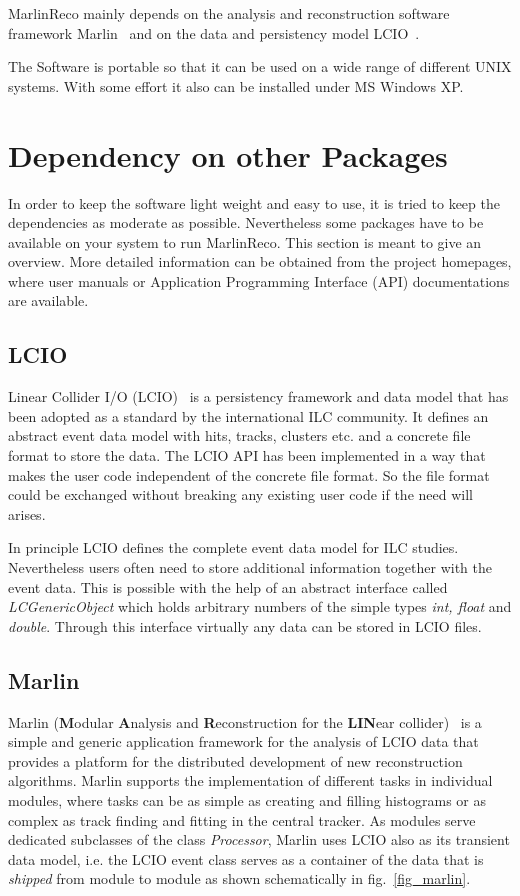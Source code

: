 MarlinReco mainly depends on the analysis and reconstruction
software framework Marlin~\cite{ref_marlin} and on the data and persistency
model LCIO~\cite{ref_lcio,ref_lciohome}.

The Software is portable so that it can be used on a wide range of
different UNIX systems. With some effort it also can be installed under
MS Windows XP.

\section{Dependency on other Packages}

In order to keep the software light weight and easy to use,
it is tried to keep the dependencies as moderate as possible.
Nevertheless some packages have to be available on your system to run
MarlinReco. This section is meant to give an overview. More detailed
information can be obtained from the project homepages, where user manuals or
Application Programming Interface (API) documentations are available.

\subsection{LCIO}

Linear Collider I/O (LCIO)~\cite{ref_lcio,ref_lciohome} is a persistency framework and data model
that has been adopted as a standard by the international ILC community.
It defines an abstract event data model with hits, tracks, clusters etc. and
a concrete file format to store the data. The LCIO API
has been implemented in a way that makes the user code
independent of the concrete file format. So the file format could be exchanged
without breaking any existing user code if the need will arises.

In principle LCIO defines the complete event data model for ILC studies.
Nevertheless users often need to store additional information together with
the event data.
This is possible with the help of an abstract interface called
{\em LCGenericObject} which holds arbitrary numbers of the simple types
{\em int, float} and {\em double}. Through this interface virtually any data
can be stored in LCIO files.

\subsection{Marlin}

Marlin ({\bf M}odular {\bf A}nalysis and {\bf R}econstruction for the
{\bf LIN}ear collider)~\cite{ref_marlin} is a simple and generic
\CPP application framework for the analysis of LCIO data that provides a
platform for the distributed development of new reconstruction
algorithms. Marlin supports the implementation of different tasks in individual
modules, where tasks can be as simple as creating and filling
histograms or as complex as track finding and fitting
in the central tracker. As modules serve dedicated subclasses of
the class {\em Processor},
Marlin uses LCIO also as its transient data model, i.e.
the LCIO event class serves as a container of the data that is
{\em shipped} from module to module as shown schematically in
fig.~\ref{fig_marlin}.


